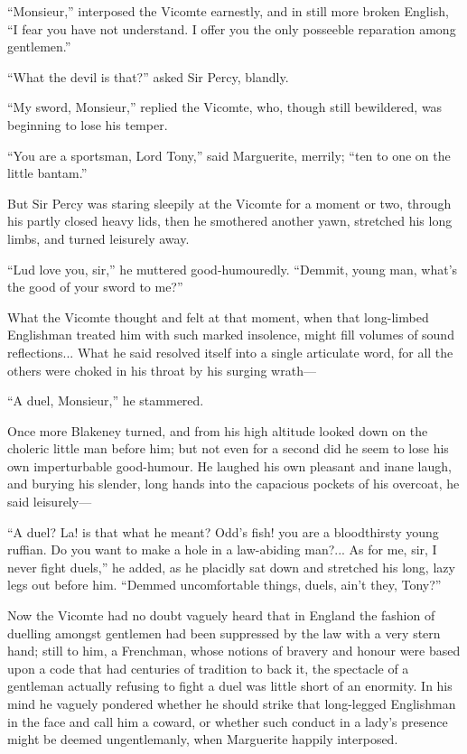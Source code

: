 \documentclass[paper=5.5in:8.5in,BCOR=7mm,twoside,DIV=calc,12pt,usegeometry,chapterprefix,endperiod,headings=big]{scrbook}
\begin{document}
\enquote{Monsieur,} interposed the Vicomte earnestly, and in still more broken English, \enquote{I fear you have not understand. I offer you the only posseeble reparation among gentlemen.}

\enquote{What the devil is that?} asked Sir Percy, blandly.

\enquote{My sword, Monsieur,} replied the Vicomte, who, though still bewildered, was beginning to lose his temper.

\enquote{You are a sportsman, Lord Tony,} said Marguerite, merrily; \enquote{ten to one on the little bantam.}

But Sir Percy was staring sleepily at the Vicomte for a moment or two, through his partly closed heavy lids, then he smothered another yawn, stretched his long limbs, and turned leisurely away.

\enquote{Lud love you, sir,} he muttered good-humouredly. \enquote{Demmit, young man, what's the good of your sword to me?}

What the Vicomte thought and felt at that moment, when that long-limbed Englishman treated him with such marked insolence, might fill volumes of sound reflections... What he said resolved itself into a single articulate word, for all the others were choked in his throat by his surging wrath---

\enquote{A duel, Monsieur,} he stammered.

Once more Blakeney turned, and from his high altitude looked down on the choleric little man before him; but not even for a second did he seem to lose his own imperturbable good-humour. He laughed his own pleasant and inane laugh, and burying his slender, long hands into the capacious pockets of his overcoat, he said leisurely---

\enquote{A duel? La! is that what he meant? Odd's fish! you are a bloodthirsty young ruffian. Do you want to make a hole in a law-abiding man?... As for me, sir, I never fight duels,} he added, as he placidly sat down and stretched his long, lazy legs out before him. \enquote{Demmed uncomfortable things, duels, ain't they, Tony?}

Now the Vicomte had no doubt vaguely heard that in England the fashion of duelling amongst gentlemen had been suppressed by the law with a very stern hand; still to him, a Frenchman, whose notions of bravery and honour were based upon a code that had centuries of tradition to back it, the spectacle of a gentleman actually refusing to fight a duel was little short of an enormity. In his mind he vaguely pondered whether he should strike that long-legged Englishman in the face and call him a coward, or whether such conduct in a lady's presence might be deemed ungentlemanly, when Marguerite happily interposed.
\end{document}
